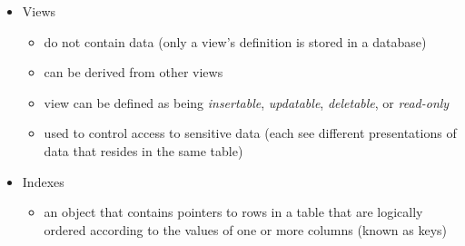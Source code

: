 \documentclass{article}
\newtheorem*{remark}{Remark}
\begin{document}
\begin{itemize}
\begin{itemize}
	\item History tables
	\item Result tables
	\item Materialized query tables (MQTs)
		\begin{itemize}
			\item improve the execution performance of qualified SELECT statements
			\item derive their definitions from the results of a query (SELECT statement)
			\item their data consists of precomputed values taken from one or more tables the MQT is based upon.
			\item MQTs can greatly improve performance and response time for complex queries, particularly queries that
			aggregate data over one or more dimensions or that join data across multiple base tables.
		\end{itemize}
	\item Temporary tables
	\item Declared global temporary tables
		\begin{itemize}
			\item are used to hold nonpresistent data temporarily, on behalf of a single application
		\end{itemize}
	\item Created global temporary tables
	\item {\color{green} Typed tables}
	\end{itemize}
	\begin{remark}
	Base tables, temporary tables, and indexes can be enabled for data compression.
	\end{remark}
\item Views
	\begin{itemize}
	\item do not contain data (only a view's definition is stored in a database)
	\item can be derived from other views
	\item view can be defined as being \textit{insertable}, \textit{updatable}, \textit{deletable},
	or \textit{read-only}
	\item used to control access to sensitive data (each see different presentations of data that 
	resides in the same table)
	\end{itemize}
\item Indexes
	\begin{itemize}
	\item an object that contains pointers to rows in a table that are logically ordered according to
	the values of one or more columns (known as keys)
	

\end{itemize}
\end{itemize}
\end{document}
